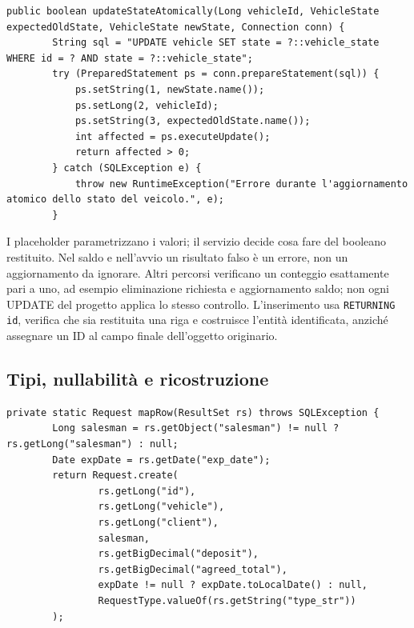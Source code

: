 \noindent\begin{minipage}{\linewidth}
\begin{lstlisting}[firstnumber=195,caption={\code{PostgresVehicleDao.java}: transizione condizionata e conteggio delle righe.},
  label=lst:update-condizionale]
    public boolean updateStateAtomically(Long vehicleId, VehicleState expectedOldState, VehicleState newState, Connection conn) {
        String sql = "UPDATE vehicle SET state = ?::vehicle_state WHERE id = ? AND state = ?::vehicle_state";
        try (PreparedStatement ps = conn.prepareStatement(sql)) {
            ps.setString(1, newState.name());
            ps.setLong(2, vehicleId);
            ps.setString(3, expectedOldState.name());
            int affected = ps.executeUpdate();
            return affected > 0;
        } catch (SQLException e) {
            throw new RuntimeException("Errore durante l'aggiornamento atomico dello stato del veicolo.", e);
        }
\end{lstlisting}
\end{minipage}


I placeholder parametrizzano i valori; il servizio decide cosa fare del
booleano restituito. Nel saldo e nell'avvio un risultato falso è un errore,
non un aggiornamento da ignorare. Altri percorsi verificano un conteggio
esattamente pari a uno, ad esempio eliminazione richiesta e aggiornamento
saldo; non ogni UPDATE del progetto applica lo stesso controllo.
L'inserimento usa \texttt{RETURNING id}, verifica che sia restituita una
riga e costruisce l'entità identificata, anziché assegnare un ID al campo
finale dell'oggetto originario.

\subsection{Tipi, nullabilità e ricostruzione}
\noindent\begin{minipage}{\linewidth}
\begin{lstlisting}[firstnumber=214,caption={\code{PostgresRequestDao.java}: NULL preservati e factory anche in lettura.},
  label=lst:mapping]
    private static Request mapRow(ResultSet rs) throws SQLException {
        Long salesman = rs.getObject("salesman") != null ? rs.getLong("salesman") : null;
        Date expDate = rs.getDate("exp_date");
        return Request.create(
                rs.getLong("id"),
                rs.getLong("vehicle"),
                rs.getLong("client"),
                salesman,
                rs.getBigDecimal("deposit"),
                rs.getBigDecimal("agreed_total"),
                expDate != null ? expDate.toLocalDate() : null,
                RequestType.valueOf(rs.getString("type_str"))
        );
\end{lstlisting}
\end{minipage}


